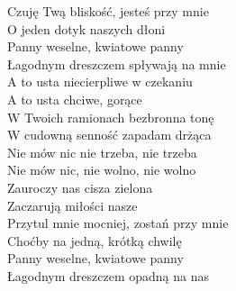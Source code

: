 \begin{text}
    Czuję Twą bliskość, jesteś przy mnie\\
    O jeden dotyk naszych dłoni\\
    Panny weselne, kwiatowe panny\\
    Łagodnym dreszczem spływają na mnie\\
    A to usta niecierpliwe w czekaniu\\
    A to usta chciwe, gorące\\
    W Twoich ramionach bezbronna tonę\\
    W cudowną senność zapadam drżąca\\
    Nie mów nic nie trzeba, nie trzeba\\
    Nie mów nic, nie wolno, nie wolno\\
    Zauroczy nas cisza zielona\\
    Zaczarują miłości nasze\\
    Przytul mnie mocniej, zostań przy mnie\\
    Choćby na jedną, krótką chwilę\\
    Panny weselne, kwiatowe panny\\
    Łagodnym dreszczem opadną na nas
\end{text}
\begin{chord}

\end{chord}